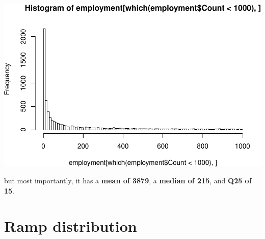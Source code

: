\documentclass[]{article}
\begin{document}
\includegraphics{rampdist_files/figure-latex/unnamed-chunk-4-1.pdf}

but most importantly, it has a \textbf{mean of 3879}, a
\textbf{median of 215}, and \textbf{Q25 of 15}.

\section{Ramp distribution}\label{ramp-distribution}
\end{document}
